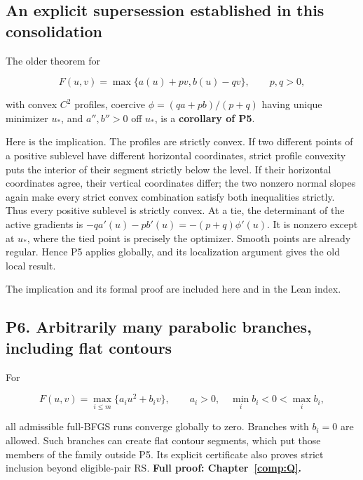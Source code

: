 

\subsection{An explicit supersession established in this consolidation}\label{an-explicit-supersession-established-in-this-consolidation}

The older theorem for

\[F(u,v)=\max\{a(u)+pv,b(u)-qv\},\qquad p,q>0,\]

with convex \(C^2\) profiles, coercive \(\phi=(qa+pb)/(p+q)\) having unique minimizer \(u_*\), and \(a'',b''>0\) off \(u_*\), is a \textbf{corollary of P5}.

Here is the implication. The profiles are strictly convex. If two different points of a positive sublevel have different horizontal coordinates, strict profile convexity puts the interior of their segment strictly below the level. If their horizontal coordinates agree, their vertical coordinates differ; the two nonzero normal slopes again make every strict convex combination satisfy both inequalities strictly. Thus every positive sublevel is strictly convex. At a tie, the determinant of the active gradients is \(-qa'(u)-pb'(u)=-(p+q)\phi'(u)\). It is nonzero except at \(u_*\), where the tied point is precisely the optimizer. Smooth points are already regular. Hence P5 applies globally, and its localization argument gives the old local result.

The implication and its formal proof are included here and in the Lean index.



\subsection{P6. Arbitrarily many parabolic branches, including flat contours}\label{p6.-arbitrarily-many-parabolic-branches-including-flat-contours}

For

\[F(u,v)=\max_{i\le m}\{a_i u^2+b_iv\},\qquad a_i>0,
\quad\min_i b_i<0<\max_i b_i,\]

all admissible full-BFGS runs converge globally to zero. Branches with \(b_i=0\) are allowed. Such branches can create flat contour segments, which put those members of the family outside P5. Its explicit certificate also proves strict inclusion beyond eligible-pair RS. \textbf{Full proof: Chapter~\ref{comp:Q}.}

